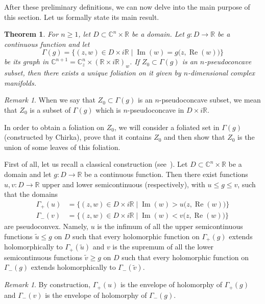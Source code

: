 \documentclass[reqno,oneside]{amsart}
\newcommand{\numberset}{\mathbb}
\newcommand{\R}{\numberset{R}}
\newcommand{\C}{\numberset{C}}
\DeclareMathOperator{\Realpart}{Re}
\renewcommand{\Re}{\Realpart}
\DeclareMathOperator{\Impart}{Im}
\renewcommand{\Im}{\Impart}
\theoremstyle{definition}
\theoremstyle{plain}
\newtheorem{theorem}[definition]{Theorem}
\theoremstyle{remark}
\newtheorem{remark}[definition]{Remark}
\begin{document}
After these preliminary definitions, we can now delve into the main purpose of this section. Let us formally state its main result. 
\begin{theorem}
\label{thm:foliation}
	For $n\geq1$, let $D\subset\C^n\times\R$ be a domain. Let $g:D\to\R$ be a continuous function and let
	\[
		\Gamma(g)=\bigl\{(z,w)\in D\times i\R \mid \Im(w)=g\bigl(z,\Re(w)\bigr)\bigr\}
	\]
	be its graph in $\C^{n+1}=\C^n_z\times(\R\times i\R)_w$. If $Z_0\subset\Gamma(g)$ is an $n$-pseudoconcave subset, then there exists a unique foliation on it given by $n$-dimensional complex manifolds.
\end{theorem}
\begin{remark}
	When we say that $Z_0\subset\Gamma(g)$ is an $n$-pseudoconcave subset, we mean that $Z_0$ is a subset of $\Gamma(g)$ which is $n$-pseudoconcave in $D\times i\R$.
\end{remark}

In order to obtain a foliation on $Z_0$, we will consider a foliated set in $\Gamma(g)$ (constructed by Chirka), prove that it contains $Z_0$ and then show that $Z_0$ is the union of some leaves of this foliation.

First of all, let us recall a classical construction (see~\cite[Lemma~1.2]{trepreau:prolongement}). Let $D\subset\C^n\times\R$ be a domain and let $g:D\to\R$ be a continuous function. Then there exist functions $u,v:D\to\R$ upper and lower semicontinuous (respectively), with $u\leq g\leq v$, such that the domains 
\begin{align*}
	\Gamma_+(u) &= \bigl\{(z,w)\in D\times i\R \mid \Im(w)>u\bigl(z,\Re(w)\bigr)\bigr\} \\
	\Gamma_-(v) &= \bigl\{(z,w)\in D\times i\R \mid \Im(w)<v\bigl(z,\Re(w)\bigr)\bigr\}
\end{align*}
are pseudoconvex. Namely, $u$ is the infimum of all the upper semicontinuous functions $\tilde{u}\leq g$ on $D$ such that every holomorphic function on $\Gamma_+(g)$ extends holomorphically to $\Gamma_+(\tilde{u})$ and $v$ is the supremum of all the lower semicontinuous functions $\tilde{v}\geq g$ on $D$ such that every holomorphic function on $\Gamma_-(g)$ extends holomorphically to $\Gamma_-(\tilde{v})$.

\begin{remark}
\label{rem:holenvelope}
	By construction, $\Gamma_+(u)$ is the envelope of holomorphy of $\Gamma_+(g)$ and $\Gamma_-(v)$ is the envelope of holomorphy of $\Gamma_-(g)$.
\end{remark}
\end{document}
